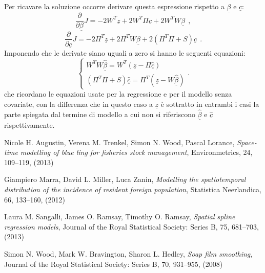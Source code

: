\documentclass[a4paper,11pt,twoside,openright]{book}							%
\begin{document}
Per ricavare la soluzione occorre derivare questa espressione rispetto a $\underline \beta$ e $\underline c$:
$$
\frac{\partial}{\partial \underline \beta}J= -2W^T \underline z + 2W^T \Pi \underline c + 2 W^TW \underline \beta \ \ ,
$$
$$
\frac{\partial}{\partial \underline c}J= -2 \Pi^T \underline z + 2 \Pi^T W \underline \beta + 2(\Pi^T \Pi + S) \underline c \ \ .
$$
Imponendo che le derivate siano uguali a zero si hanno le seguenti equazioni:
$$
\begin{cases}
W^TW \hat{\underline \beta} = W^T(\underline z - \Pi \hat{\underline c})  \\
(\Pi^T \Pi + S) \hat{\underline c}=\Pi^T(\underline z -W \hat{\underline \beta})
\end{cases}.
$$
che ricordano le equazioni usate per la regressione e per il modello senza covariate, con la differenza che in questo caso a $\underline z$ è sottratto in entrambi i casi la parte spiegata dal termine di modello a cui non si riferiscono $\hat{\underline \beta}$ e $\hat{\underline c}$ rispettivamente.

\begin{thebibliography}{9}

Nicole H. Augustin, Verena M. Trenkel, Simon N. Wood, Pascal Lorance, \emph{Space-time modelling of blue ling for fisheries stock management}, Environmetrics, 24, 109–119, (2013)

Giampiero Marra, David L. Miller, Luca Zanin, \emph{Modelling the spatiotemporal distribution of the incidence of resident foreign population}, Statistica Neerlandica, 66, 133–160, (2012)

Laura M. Sangalli, James O. Ramsay, Timothy O. Ramsay, \emph{Spatial spline regression models}, Journal of the Royal Statistical Society: Series B, 75, 681–703, (2013)

Simon N. Wood, Mark W. Bravington, Sharon L. Hedley, \emph{Soap film smoothing}, Journal of the Royal Statistical Society: Series B, 70, 931–955, (2008)



\end{thebibliography}
\end{document}
